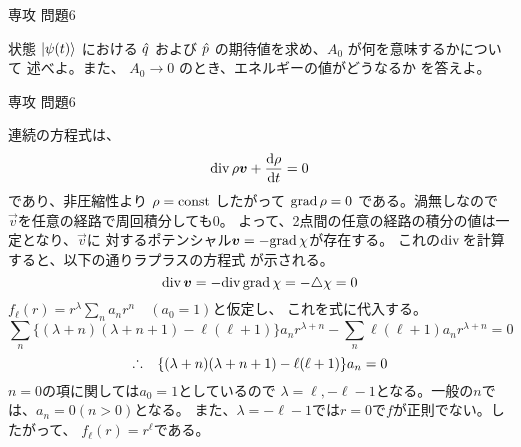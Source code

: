 \documentclass[fleqn]{jbook}
\begin{document}
\begin{question}{専攻 問題6}{}
\begin{subquestions}
\begin{subsubquestions}
  \SubSubQuestion
    状態 $\Ket{\psi(t)}$ における $\hq$ および
    $\hp$ の期待値を求め、$A_0$ が何を意味するかについて
    述べよ。また、 $A_0 \to 0$ のとき、エネルギーの値がどうなるか
    を答えよ。

  \end{subsubquestions}
\end{subquestions}
\end{question}

\begin{answer}{専攻 問題6}{}
\begin{subanswers}
\SubAnswer
  \begin{subsubanswers}
  \SubSubAnswer
    連続の方程式は、
%
    \[ \Div{\rho\Vec{v}}+\Deriver{\rho}{t}=0 \]
%
    であり、非圧縮性より $\rho={\rm const}$ したがって $\Grad{\rho}=0$
    である。渦無しなので $\Vec{v}$を任意の経路で周回積分しても$0$。
    よって、2点間の任意の経路の積分の値は一定となり、$\Vec{v}$に
    対するポテンシャル$\Vec{v}=-\Grad{\chi}$が存在する。
    これの$\Div{}$を計算すると、以下の通りラプラスの方程式
    が示される。
%
    \[ \Div{\Vec{v}}=-\Div{\Grad{\chi}} =-\Laplacian{\chi} =0 \]
%
  \SubSubAnswer
    $f_\ell(r)=r^\lambda\sum_{n}a_nr^{n}\quad(a_0=1)$と仮定し、
    これを式に代入する。
%
    \[ \sum_n \{ (\lambda+n)(\lambda+n+1)%
               -\ell (\ell +1)\} a_nr^{\lambda+n}%
     - \sum_n \ell (\ell +1) a_nr^{\lambda+n} = 0 \]
    \[ \Yueni \{ (\lambda+n)(\lambda+n+1)-\ell (\ell +1) \}a_n=0 \]
%
    $n=0$の項に関しては$a_0=1$としているので
    $\lambda=\ell ,-\ell -1$となる。一般の$n$では、$a_n=0(n>0)$となる。
    また、$\lambda=-\ell -1$では$r=0$で$f$が正則でない。したがって、 
    $f_\ell(r)=r^\ell$である。

  \end{subsubanswers}



\end{subanswers}
\end{answer}
\end{document}
